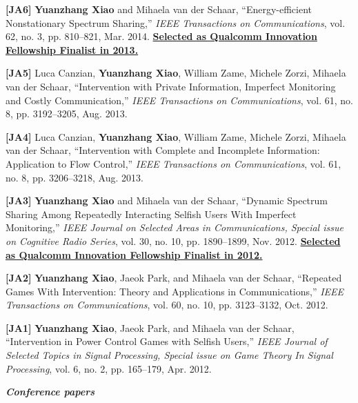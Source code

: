 \documentclass[margin,line]{res}
\begin{document}
\begin{resume}
\textbf{[JA6]} {\bf Yuanzhang Xiao} and Mihaela van der Schaar, ``Energy-efficient Nonstationary Spectrum Sharing,'' \emph{IEEE Transactions on Communications}, vol. 62, no. 3, pp. 810--821, Mar. 2014. \href{https://www.qualcomm.com/invention/research/university-relations/innovation-fellowship/finalists}
{\textbf{Selected as Qualcomm Innovation Fellowship Finalist in 2013.}}

\textbf{[JA5]} Luca Canzian, {\bf Yuanzhang Xiao}, William Zame, Michele Zorzi, Mihaela van der Schaar, ``Intervention with Private Information, Imperfect Monitoring and Costly Communication,'' \emph{IEEE Transactions on Communications}, vol. 61, no. 8, pp. 3192--3205, Aug. 2013.

\textbf{[JA4]} Luca Canzian, {\bf Yuanzhang Xiao}, William Zame, Michele Zorzi, Mihaela van der Schaar, ``Intervention with Complete and Incomplete Information: Application to Flow Control,''  \emph{IEEE Transactions on Communications}, vol. 61, no. 8, pp. 3206--3218, Aug. 2013.

\textbf{[JA3]} {\bf Yuanzhang Xiao} and Mihaela van der Schaar, ``Dynamic Spectrum Sharing Among Repeatedly Interacting Selfish Users With Imperfect Monitoring,'' \emph{IEEE Journal on Selected Areas in Communications, Special issue on Cognitive Radio Series}, vol. 30, no. 10, pp. 1890--1899, Nov. 2012.
\href{https://www.qualcomm.com/invention/research/university-relations/innovation-fellowship/finalists}
{\textbf{Selected as Qualcomm Innovation Fellowship Finalist in 2012.}}

\textbf{[JA2]} {\bf Yuanzhang Xiao}, Jaeok Park, and Mihaela van der Schaar, ``Repeated Games With Intervention: Theory and Applications in Communications,'' \emph{IEEE Transactions on Communications}, vol. 60, no. 10, pp. 3123--3132, Oct. 2012.

\textbf{[JA1]} {\bf Yuanzhang Xiao}, Jaeok Park, and Mihaela van der Schaar, ``Intervention in Power Control Games with Selfish Users,'' \emph{IEEE Journal of Selected Topics in Signal Processing, Special issue on Game Theory In Signal Processing}, vol. 6, no. 2, pp. 165--179, Apr. 2012.

%
%

{\em \textbf{Conference papers}}


\end{resume}
\end{document}
